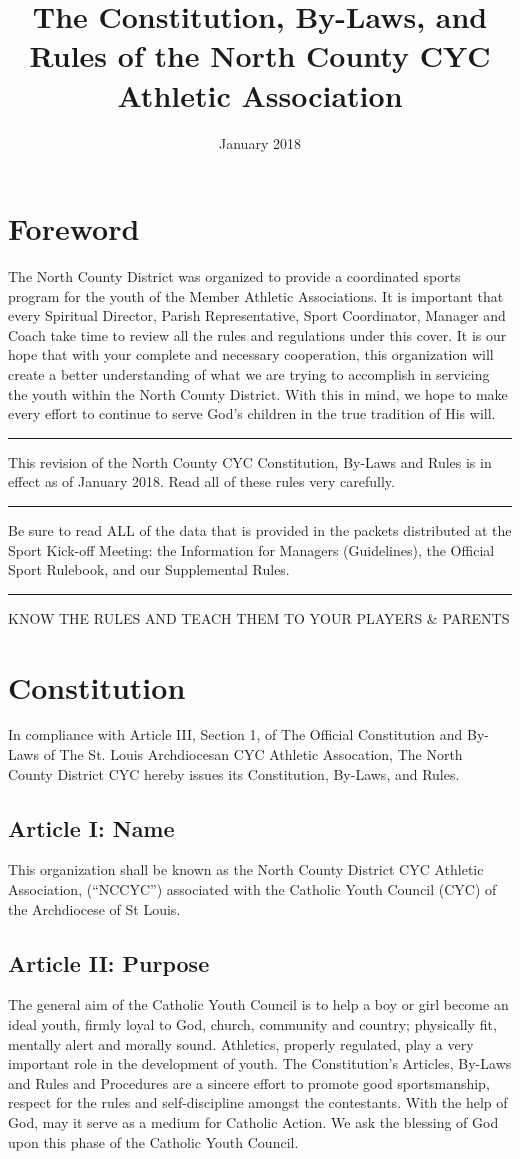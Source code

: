\documentclass[draft]{memoir}
\title{The Constitution, By-Laws, and Rules of the North County CYC Athletic Association}
\date{January 2018}
\author{}
\begin{document}
\maketitle

\frontmatter
\tableofcontents
\mainmatter
\chapter{Foreword}
The North County District was organized to provide a coordinated sports program for the youth of the Member Athletic Associations.  It is important that every Spiritual Director, Parish Representative, Sport Coordinator, Manager and Coach take time to review all the rules and regulations under this cover.  It is our hope that with your complete and necessary cooperation, this organization will create a better understanding of what we are trying to accomplish in servicing the youth within the North County District.  With this in mind, we hope to make every effort to continue to serve God's children in the true tradition of His will.
\plainbreak{4}
This revision of the North County CYC Constitution, By-Laws and Rules is in effect as of January 2018.  
Read all of these rules very carefully.  
\plainbreak{4}
Be sure to read ALL of the data that is provided in the packets distributed at the Sport Kick-off Meeting:  the Information for Managers (Guidelines), the Official Sport Rulebook, and our Supplemental Rules.
\plainbreak{4}
KNOW THE RULES AND TEACH THEM TO YOUR PLAYERS \& PARENTS

\chapter{Constitution}
In compliance with Article III, Section 1, of The Official Constitution and By-Laws of The St. Louis Archdiocesan CYC Athletic Assocation, The North County District CYC hereby issues its Constitution, By-Laws, and Rules.

\section[Article I: Name]{Article I: Name}
This organization shall be known as the North County District CYC Athletic Association, (“NCCYC”) associated with the Catholic Youth Council (CYC) of the Archdiocese of St Louis.

\section[Article II: Purpose]{Article II: Purpose}
The general aim of the Catholic Youth Council is to help a boy or girl become an ideal youth, firmly loyal to God, church, community and country; physically fit, mentally alert and morally sound.  Athletics, properly regulated, play a very important role in the development of youth.  The Constitution’s Articles, By-Laws and Rules and Procedures are a sincere effort to promote good sportsmanship, respect for the rules and self-discipline amongst the contestants.  With the help of God, may it serve as a medium for Catholic Action.  We ask the blessing of God upon this phase of the Catholic Youth Council.
\end{document}
